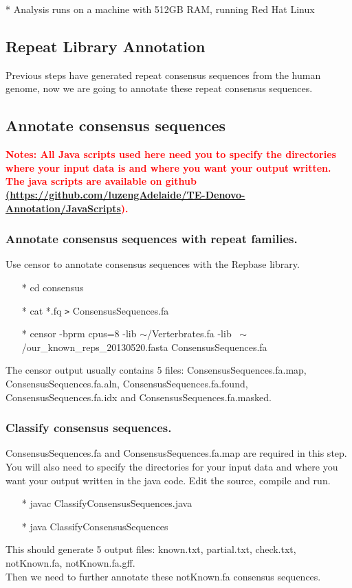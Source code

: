 \documentclass[12pt]{report}
\begin{document}
* Analysis runs on a machine with 512GB RAM, running Red Hat Linux \\


\subsection*{Repeat Library Annotation}
Previous steps have generated repeat consensus sequences from the human genome, now we are going to annotate these repeat consensus sequences.

\subsection*{Annotate consensus sequences}
\textbf{\textcolor{red}{Notes: All Java scripts used here need you to specify the directories where your input data is and where you want your output written. The java scripts are available on github \href{<url>}(\url{https://github.com/luzengAdelaide/TE-Denovo-Annotation/JavaScripts}). }}

\subsubsection*{Annotate consensus sequences with repeat families.}
Use censor to annotate consensus sequences with the Repbase library. 
\begin{enumerate}
	\item[*] cd consensus
	\item[*] cat *.fq \texttt{>} ConsensusSequences.fa 
	\item[*] censor -bprm cpus=8 -lib $\sim$/Verterbrates.fa -lib ~$\sim$/our\_known\_reps\_20130520.fasta ConsensusSequences.fa 
\end{enumerate}
The censor output usually contains 5 files: ConsensusSequences.fa.map, ConsensusSequences.fa.aln, ConsensusSequences.fa.found, ConsensusSequences.fa.idx and ConsensusSequences.fa.masked.  \\

\subsubsection*{Classify consensus sequences.}
ConsensusSequences.fa and ConsensusSequences.fa.map are required in this step. You will also need to specify the directories for your input data and where you want your output written in the java code. Edit the source, compile and run.\\
\begin{enumerate}
	\item[*] javac ClassifyConsensusSequences.java
	\item[*] java ClassifyConsensusSequences
\end{enumerate}
This should generate 5 output files: known.txt, partial.txt, check.txt, notKnown.fa, notKnown.fa.gff. \\
Then we need to further annotate these notKnown.fa consensus sequences. 
\end{document}
